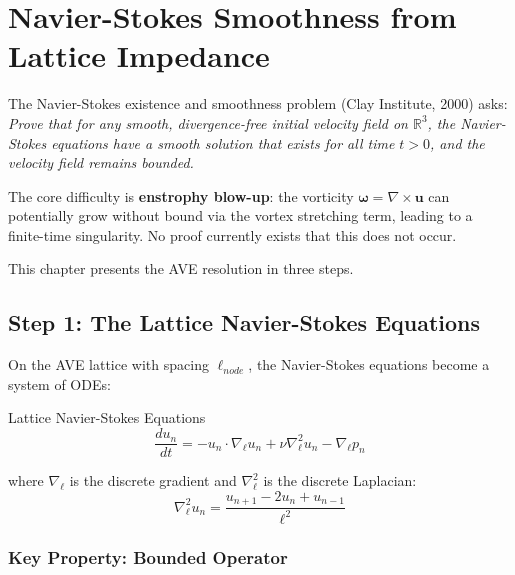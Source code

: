 
\chapter{Navier-Stokes Smoothness from Lattice Impedance}
\label{ch:navier_stokes}

The Navier-Stokes existence and smoothness problem (Clay Institute, 2000)
asks: \textit{Prove that for any smooth, divergence-free initial velocity
field on $\mathbb{R}^3$, the Navier-Stokes equations have a smooth
solution that exists for all time $t > 0$, and the velocity field
remains bounded.}

The core difficulty is \textbf{enstrophy blow-up}: the vorticity
$\boldsymbol{\omega} = \nabla \times \mathbf{u}$ can potentially grow
without bound via the vortex stretching term, leading to a
finite-time singularity.  No proof currently exists that this
does not occur.

This chapter presents the AVE resolution in three steps.

\section{Step 1: The Lattice Navier-Stokes Equations}
\label{sec:ns_lattice}

On the AVE lattice with spacing $\ell_{node}$, the Navier-Stokes
equations become a system of ODEs:
\begin{resultbox}{Lattice Navier-Stokes Equations}
\begin{equation}
    \frac{du_n}{dt} = -u_n \cdot \nabla_{\ell} u_n
    + \nu \nabla^2_{\ell} u_n - \nabla_{\ell} p_n
    \label{eq:lattice_ns}
\end{equation}
\end{resultbox}
where $\nabla_{\ell}$ is the discrete gradient and
$\nabla^2_{\ell}$ is the discrete Laplacian:
\begin{equation}
    \nabla^2_{\ell} u_n
    = \frac{u_{n+1} - 2u_n + u_{n-1}}{\ell^2}
    \label{eq:discrete_laplacian}
\end{equation}

\subsection{Key Property: Bounded Operator}

